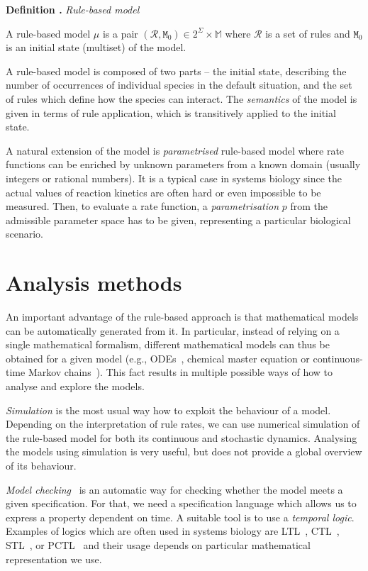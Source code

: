 \documentclass[11pt,a4paper]{report}
\newcounter{counter}[section]
\renewcommand{\thecounter}{\thechapter.\arabic{counter}}
\newenvironment{definition}[1]{\bigskip\refstepcounter{counter}\noindent\textbf{Definition \thecounter } \emph{#1} \par\nopagebreak\noindent \begin{itshape}}{\end{itshape}\bigskip}
\begin{document}
\begin{definition}{Rule-based model}
A rule-based model $\mu$ is a pair $(\mathcal{R}, \mathtt{M}_0) \in 2^\Sigma \times \mathbb{M}$ where $\mathcal{R}$ is a set of rules and $\mathtt{M}_0$ is an initial state (multiset) of the model.
\end{definition}

A rule-based model is composed of two parts -- the initial state, describing the number of occurrences of individual species in the default situation, and the set of rules which define how the species can interact. The \emph{semantics} of the model is given in terms of rule application, which is transitively applied to the initial state.

A natural extension of the model is \emph{parametrised} rule-based model where rate functions can be enriched by unknown parameters from a known domain (usually integers or rational numbers). It is a typical case in systems biology since the actual values of reaction kinetics are often hard or even impossible to be measured. Then, to evaluate a rate function, a \emph{parametrisation} $p$ from the admissible parameter space has to be given, representing a particular biological scenario.

\section{Analysis methods}

An important advantage of the rule-based approach is that mathematical models can be automatically generated from it. In particular, instead of relying on a single mathematical formalism, different mathematical models can thus be obtained for a given model (e.g., ODEs~\cite{camporesi2017k}, chemical master equation or continuous-time Markov chains~\cite{pauleve2010generic,sneddon2011efficient}). This fact results in multiple possible ways of how to analyse and explore the models.

\emph{Simulation} is the most usual way how to exploit the behaviour of a model. Depending on the interpretation of rule rates, we can use numerical simulation of the rule-based model for both its continuous and stochastic dynamics. Analysing the models using simulation is very useful, but does not provide a global overview of its behaviour.

\emph{Model checking}~\cite{clarke2018model} is an automatic way for checking whether the model meets a given specification. For that, we need a specification language which allows us to express a property dependent on time. A suitable tool is to use a \emph{temporal logic}. Examples of logics which are often used in systems biology are LTL~\cite{pnueli1977temporal}, CTL~\cite{clarke1986automatic}, STL~\cite{maler2004monitoring}, or PCTL~\cite{hasson1994logic} and their usage depends on particular mathematical representation we use.
\end{document}
